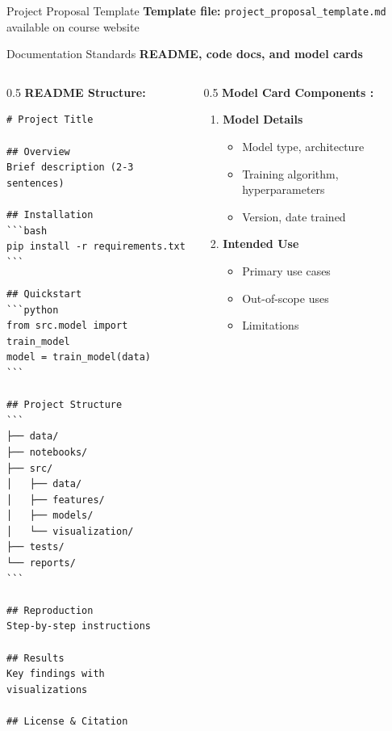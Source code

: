 \begin{frame}[fragile]{Project Proposal Template}
\vspace{0.2cm}
\textbf{Template file:} \texttt{project\_proposal\_template.md} available on course website
\end{frame}


\begin{frame}[fragile]{Documentation Standards}
\textbf{README, code docs, and model cards}

\begin{columns}
\begin{column}{0.5\textwidth}
\textbf{README Structure:}

\begin{verbatim}
# Project Title

## Overview
Brief description (2-3 sentences)

## Installation
```bash
pip install -r requirements.txt
```

## Quickstart
```python
from src.model import train_model
model = train_model(data)
```

## Project Structure
```
├── data/
├── notebooks/
├── src/
│   ├── data/
│   ├── features/
│   ├── models/
│   └── visualization/
├── tests/
└── reports/
```

## Reproduction
Step-by-step instructions

## Results
Key findings with visualizations

## License & Citation
\end{verbatim}
\end{column}

\begin{column}{0.5\textwidth}
\textbf{Model Card Components \cite{mitchell2019model}:}

\begin{enumerate}
\item \textbf{Model Details}
   \begin{itemize}
   \item Model type, architecture
   \item Training algorithm, hyperparameters
   \item Version, date trained
   \end{itemize}

\item \textbf{Intended Use}
   \begin{itemize}
   \item Primary use cases
   \item Out-of-scope uses
   \item Limitations
   \end{itemize}


\end{enumerate}
\end{column}
\end{columns}
\end{frame}
